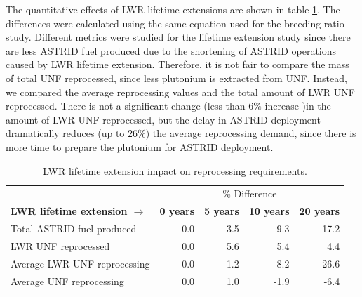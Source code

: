 The quantitative effects of
\gls{LWR} lifetime extensions are shown in table \ref{tab:ext_met}.
The differences were calculated using the same equation used for the
breeding ratio study. Different metrics were studied for the lifetime
extension study since there are less \gls{ASTRID} fuel produced due to
the shortening of \gls{ASTRID} operations caused by \gls{LWR} lifetime
extension. Therefore, it is not fair to compare the mass of total \gls{UNF} reprocessed,
since less plutonium is extracted from \gls{UNF}. Instead, we compared the
average reprocessing values and the total amount of \gls{LWR} \gls{UNF} reprocessed.
There is not a significant change (less than $6\%$ increase )in the amount of \gls{LWR}
\gls{UNF} reprocessed, but the delay in \gls{ASTRID} deployment
dramatically reduces (up to $26\%$) the average reprocessing demand, since there is
more time to prepare the plutonium for \gls{ASTRID} deployment.

\begin{table}[h]
	\centering
	\caption{\gls{LWR} lifetime extension impact on reprocessing requirements.}
	\begin{tabular}{lrrrr}
		\hline
		& \multicolumn{4}{c}{\% Difference} \\
		\textbf{\gls{LWR} lifetime extension $\longrightarrow$}& \textbf{0 years}& \textbf{5 years} & \textbf{10 years} & \textbf{20 years} \\
		\hline
		Total \gls{ASTRID} fuel produced & 0.0 & -3.5 & -9.3 & -17.2 \\
		\gls{LWR} \gls{UNF} reprocessed & 0.0  & 5.6 & 5.4 & 4.4 \\
		Average \gls{LWR} \gls{UNF} reprocessing & 0.0 & 1.2 & -8.2 & -26.6 \\
		Average \gls{UNF} reprocessing & 0.0 & 1.0 & -1.9 & -6.4 \\
		\hline
	\end{tabular}
	\label{tab:ext_met}
\end{table}
